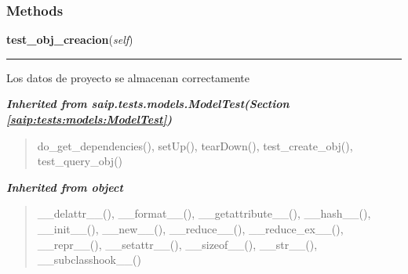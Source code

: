 
  \subsubsection{Methods}

    \label{saip:tests:models:test_proyecto:TestProyecto:test_obj_creacion}

    \vspace{0.5ex}

\hspace{.8\funcindent}\begin{boxedminipage}{\funcwidth}

    \raggedright \textbf{test\_obj\_creacion}(\textit{self})

    \vspace{-1.5ex}

    \rule{\textwidth}{0.5\fboxrule}
\setlength{\parskip}{2ex}
    Los datos de proyecto se almacenan correctamente

\setlength{\parskip}{1ex}
    \end{boxedminipage}


\large{\textbf{\textit{Inherited from saip.tests.models.ModelTest\textit{(Section \ref{saip:tests:models:ModelTest})}}}}

\begin{quote}
do\_get\_dependencies(), setUp(), tearDown(), test\_create\_obj(), test\_query\_obj()
\end{quote}

\large{\textbf{\textit{Inherited from object}}}

\begin{quote}
\_\_delattr\_\_(), \_\_format\_\_(), \_\_getattribute\_\_(), \_\_hash\_\_(), \_\_init\_\_(), \_\_new\_\_(), \_\_reduce\_\_(), \_\_reduce\_ex\_\_(), \_\_repr\_\_(), \_\_setattr\_\_(), \_\_sizeof\_\_(), \_\_str\_\_(), \_\_subclasshook\_\_()
\end{quote}


